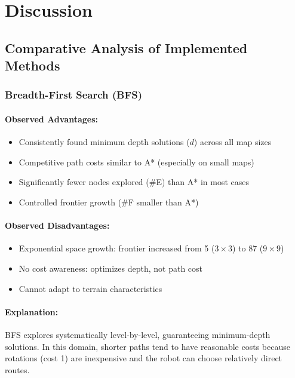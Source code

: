 \documentclass[11pt,a4paper]{article}
\begin{document}
\section{Discussion}

\subsection{Comparative Analysis of Implemented Methods}

\subsubsection{Breadth-First Search (BFS)}

\paragraph{Observed Advantages:}
\begin{itemize}[leftmargin=1.5cm,itemsep=0.1em]
    \item Consistently found minimum depth solutions ($d$) across all map sizes
    \item Competitive path costs similar to A* (especially on small maps)
    \item Significantly fewer nodes explored (\#E) than A* in most cases
    \item Controlled frontier growth (\#F smaller than A*)
\end{itemize}

\paragraph{Observed Disadvantages:}
\begin{itemize}[leftmargin=1.5cm,itemsep=0.1em]
    \item Exponential space growth: frontier increased from 5 ($3\times3$) to 87 ($9\times9$)
    \item No cost awareness: optimizes depth, not path cost
    \item Cannot adapt to terrain characteristics
\end{itemize}

\paragraph{Explanation:}
BFS explores systematically level-by-level, guaranteeing minimum-depth solutions. In this domain, shorter paths tend to have reasonable costs because rotations (cost 1) are inexpensive and the robot can choose relatively direct routes.
\end{document}
